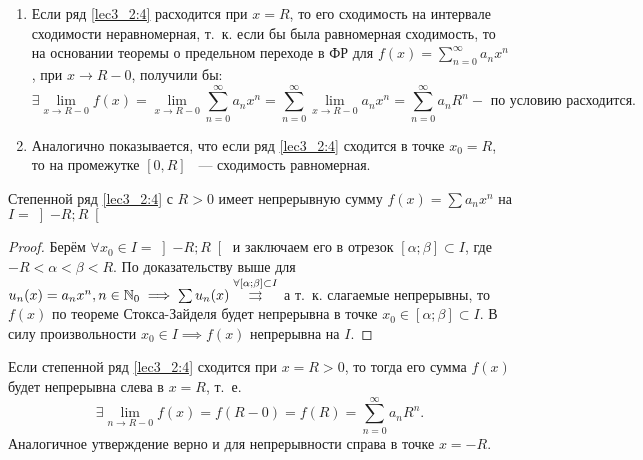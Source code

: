 \documentclass[../../main.tex]{subfiles}
\begin{document}
\begin{rems}
	\;
	
	\begin{enumerate}
		\item Если ряд \eqref{lec3_2:4} расходится при $x = R$, то его 
		сходимость на интервале сходимости неравномерная, т.~к. если 
		бы была равномерная сходимость, то на основании теоремы 
		о предельном переходе в ФР для $f(x) = \sum\limits_{n = 0}^{\infty} 
		a_n x^n$, при $x \longrightarrow R - 0$, получили бы:
		\[ \exists \underset{x \to R - 0}{\lim} f(x) = 
		\underset{x \to R - 0}{\lim} \sum\limits_{n = 0}^{\infty} a_n x^n = 	
		\sum\limits_{n = 0}^{\infty} \underset{x \to R - 0}{\lim} a_n x^n = 
		\sum\limits_{n = 0}^{\infty} a_n R^n - \text{ по условию расходится.}
		\]
		
		\item Аналогично показывается, что если ряд 
		\eqref{lec3_2:4} сходится в точке 
		$x_0 = R$, то на промежутке $[0, R]$ ~--- сходимость равномерная.
	\end{enumerate}
\end{rems}

\begin{crl}
	\;
	
	Степенной ряд \eqref{lec3_2:4} с $R > 0$ имеет непрерывную сумму 
	$f(x) = \sum a_n x^n$ на $I = \left]-R; R\right[$
\end{crl}

\begin{proof}
	Берём $\forall x_0 \in I = \left]-R; R\right[$ и заключаем его в отрезок 
	$[\alpha; \beta] \subset I$, где $-R < \alpha < \beta < R$. 
	По доказательству выше для $u_n(x) = a_n x^n, n \in \mathbb{N}_0 \implies 
	\sum u_n(x) \overset{\forall [\alpha; \beta] \subset I}{\rightrightarrows}$
	а т.~к. слагаемые непрерывны, то $f(x)$ по теореме Стокса-Зайделя
	будет непрерывна в точке $x_0 \in [\alpha; \beta] \subset I$.
	В силу произвольности $x_0 \in I \implies f(x)$ непрерывна на $I$.
\end{proof}

\begin{crl}
	Если степенной ряд \eqref{lec3_2:4} сходится при $x = R > 0$, то
	тогда его сумма $f(x)$ будет непрерывна слева в $x = R$, т.~е.
	\[ \exists \underset{n \to R - 0}{\lim} f(x) = f(R - 0) = f(R) 
	= \sum\limits_{n = 0}^{\infty} a_n R^n.
	\]
	Аналогичное утверждение верно и для непрерывности справа в точке $x = -R$.
\end{crl}
\end{document}
